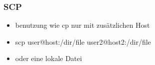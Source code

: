 \begin{frame}
\frametitle{SCP}
\begin{itemize}
\item benutzung wie cp nur mit zusätzlichen Host
\item scp user@host:/dir/file user2@host2:/dir/file
\item oder eine lokale Datei
\end{itemize}
\end{frame}